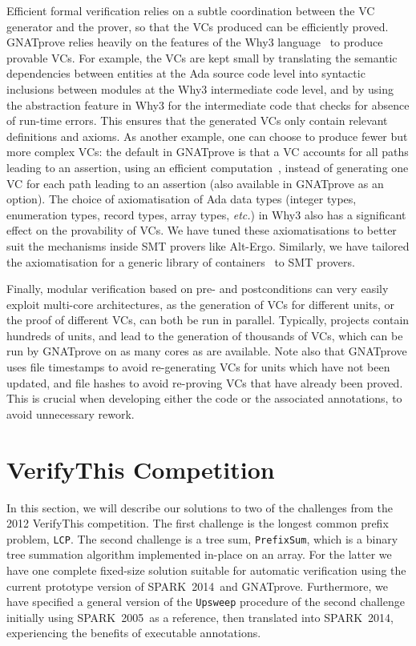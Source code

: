 \documentclass[sttt,final]{svjour}
\newcommand{\gnatprove}{GNATprove\xspace}
\newcommand{\oldspark}{SPARK~2005\xspace}
\newcommand{\newspark}{SPARK~2014\xspace}
\newcommand{\etc}{\textit{etc.}\xspace}
\begin{document}
Efficient formal verification relies on a subtle coordination between
the VC generator and the prover, so that the VCs produced can be
efficiently proved. \gnatprove relies heavily on the features of the
Why3 language~\cite{guitton2011boogie} to produce provable VCs. For
example, the VCs are kept small by translating the semantic
dependencies between entities at the Ada source code level into
syntactic inclusions between modules at the Why3 intermediate code
level, and by using the abstraction feature in Why3 for the
intermediate code that checks for absence of run-time errors. This
ensures that the generated VCs only contain relevant definitions and
axioms. As another example, one can choose to produce fewer but more
complex VCs: the default in \gnatprove is that a VC accounts for all
paths leading to an assertion, using an efficient
computation~\cite{leino2005ipl}, instead of generating one VC for each
path leading to an assertion (also available in \gnatprove as an
option). The choice of axiomatisation of Ada data types (integer
types, enumeration types, record types, array types, \etc) in Why3
also has a significant effect on the provability of VCs. We have tuned
these axiomatisations to better suit the mechanisms inside SMT provers
like Alt-Ergo. Similarly, we have tailored the axiomatisation for a
generic library of containers~\cite{dross:2011:tap} to SMT provers.

Finally, modular verification based on pre- and postconditions can
very easily exploit multi-core architectures, as the generation of VCs
for different units, or the proof of different VCs, can both be run in
parallel. Typically, projects contain hundreds of units, and lead to
the generation of thousands of VCs, which can be run by \gnatprove on
as many cores as are available. Note also that \gnatprove uses file
timestamps to avoid re-generating VCs for units which have not been
updated, and file hashes to avoid re-proving VCs that have already
been proved. This is crucial when developing either the code or the
associated annotations, to avoid unnecessary rework.

\section{VerifyThis Competition}
\label{verifythis}
In this section, we will describe our solutions to two of the
challenges from the 2012 VerifyThis competition. The first challenge
is the longest common prefix problem, \verb|LCP|. The second challenge
is a tree sum, \verb|PrefixSum|, which is a binary tree summation
algorithm implemented in-place on an array. For the latter we have one
complete fixed-size solution suitable for automatic verification using
the current prototype version of \newspark\ and
\gnatprove. Furthermore, we have specified a general version of the
\verb|Upsweep| procedure of the second challenge initially using
\oldspark\ as a reference, then translated into \newspark,
experiencing the benefits of executable annotations.
\end{document}
